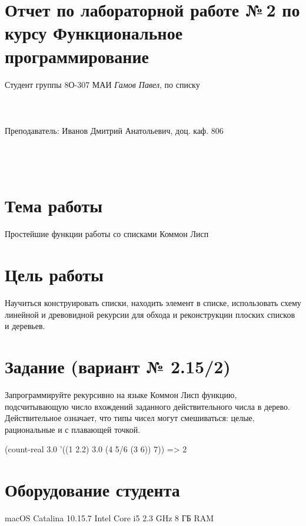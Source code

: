 \documentclass[15pt]{extarticle}
\begin{document}
\section*{Отчет по лабораторной работе №\,2
по курсу \guillemotleft  Функциональное программирование\guillemotright}

\begin{flushright}
Студент группы 8О-307 МАИ \textit{Гамов Павел},  по списку \\
 \\
 \\
\ \\
Преподаватель: Иванов Дмитрий Анатольевич, доц. каф. 806 \\
 \\
 \\
 \\

\end{flushright}

\section{Тема работы}
Простейшие функции работы со списками Коммон Лисп

\section{Цель работы}
Научиться конструировать списки, находить элемент в списке, использовать схему линейной и древовидной рекурсии для обхода и реконструкции плоских списков и деревьев.

\section{Задание (вариант № 2.15/2)}
Запрограммируйте рекурсивно на языке Коммон Лисп функцию, подсчитывающую число вхождений заданного действительного числа в дерево. Действительное означает, что типы чисел могут смешиваться: целые, рациональные и с плавающей точкой.

(count-real 3.0 '((1 2.2) 3.0 (4 5/6 (3 6)) 7)) => 2

\section{Оборудование студента}
macOS Catalina 10.15.7 Intel Core i5 2.3 GHz 8 ГБ RAM
\end{document}
